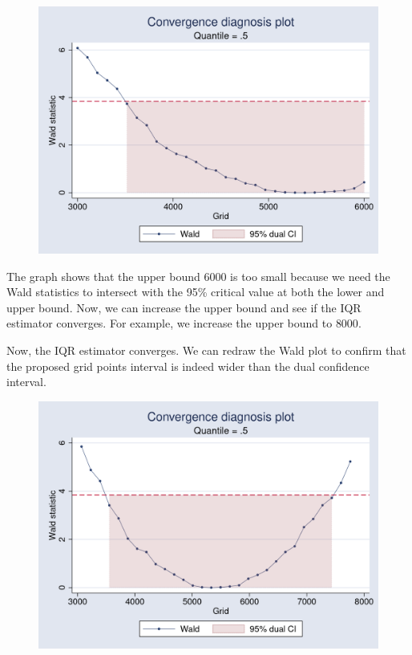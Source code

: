 \begin{stlog}

\end{stlog}

\begin{figure}[H]
\centering
\includegraphics[scale=0.25]{eps/ex4_waldplot2}
\end{figure}

The graph shows that the upper bound $6000$ is too small because we need the
Wald statistics to intersect with the 95\% critical value at both the lower and
upper bound. Now, we can increase the upper bound and see if the IQR estimator
converges. For example, we increase the upper bound to $8000$.

\begin{stlog}

\end{stlog}

Now, the IQR estimator converges. We can redraw the Wald plot to confirm that
the proposed grid points interval is indeed wider than the dual confidence
interval.

\begin{stlog}

\end{stlog}

\begin{figure}[H]
\centering
\includegraphics[scale=0.25]{eps/ex4_waldplot3}
\end{figure}
